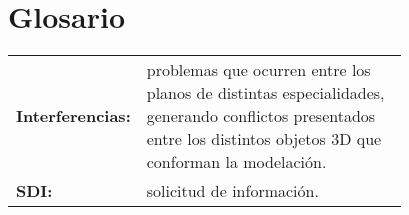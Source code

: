 \chapter*{Glosario}

\begin{tabular}{l p{0.78\linewidth}}
    \textbf{Interferencias:} & problemas que ocurren entre los planos de distintas especialidades, generando conflictos presentados entre los distintos objetos 3D que conforman la modelación. \\

    \textbf{SDI:} & solicitud de información.
\end{tabular}  


